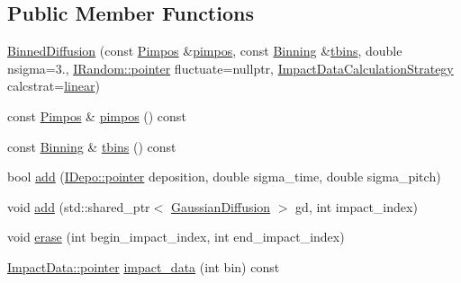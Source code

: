 \subsection*{Public Member Functions}
\begin{DoxyCompactItemize}
\item 
\hyperlink{class_wire_cell_1_1_gen_1_1_binned_diffusion_a56e229d36047227ce458ac4165a5b5ce}{Binned\+Diffusion} (const \hyperlink{class_wire_cell_1_1_pimpos}{Pimpos} \&\hyperlink{class_wire_cell_1_1_gen_1_1_binned_diffusion_acdc13c03fa55ddc92c6cd134d07b6bf3}{pimpos}, const \hyperlink{class_wire_cell_1_1_binning}{Binning} \&\hyperlink{class_wire_cell_1_1_gen_1_1_binned_diffusion_add5e00394c16a9fc27be4b7d617fa59b}{tbins}, double nsigma=3., \hyperlink{class_wire_cell_1_1_interface_a09c548fb8266cfa39afb2e74a4615c37}{I\+Random\+::pointer} fluctuate=nullptr, \hyperlink{class_wire_cell_1_1_gen_1_1_binned_diffusion_a96d624fc75e70453e7e29c381850d218}{Impact\+Data\+Calculation\+Strategy} calcstrat=\hyperlink{class_wire_cell_1_1_gen_1_1_binned_diffusion_a96d624fc75e70453e7e29c381850d218a6079f954d643f93c2c08d58967c21e0e}{linear})
\item 
const \hyperlink{class_wire_cell_1_1_pimpos}{Pimpos} \& \hyperlink{class_wire_cell_1_1_gen_1_1_binned_diffusion_acdc13c03fa55ddc92c6cd134d07b6bf3}{pimpos} () const
\item 
const \hyperlink{class_wire_cell_1_1_binning}{Binning} \& \hyperlink{class_wire_cell_1_1_gen_1_1_binned_diffusion_add5e00394c16a9fc27be4b7d617fa59b}{tbins} () const
\item 
bool \hyperlink{class_wire_cell_1_1_gen_1_1_binned_diffusion_a9c4c6664c76ad07ad29d71bdb8fb92f1}{add} (\hyperlink{class_wire_cell_1_1_i_data_aff870b3ae8333cf9265941eef62498bc}{I\+Depo\+::pointer} deposition, double sigma\+\_\+time, double sigma\+\_\+pitch)
\item 
void \hyperlink{class_wire_cell_1_1_gen_1_1_binned_diffusion_a61e86aee3ea24b3a56b58f8c310300d4}{add} (std\+::shared\+\_\+ptr$<$ \hyperlink{class_wire_cell_1_1_gen_1_1_gaussian_diffusion}{Gaussian\+Diffusion} $>$ gd, int impact\+\_\+index)
\item 
void \hyperlink{class_wire_cell_1_1_gen_1_1_binned_diffusion_a1b261eff7e9581f22bd83d1ea40077ed}{erase} (int begin\+\_\+impact\+\_\+index, int end\+\_\+impact\+\_\+index)
\item 
\hyperlink{class_wire_cell_1_1_gen_1_1_impact_data_a4fb9b565e1525c7ccde05ded67f467c2}{Impact\+Data\+::pointer} \hyperlink{class_wire_cell_1_1_gen_1_1_binned_diffusion_a22377d1afccdee836981ce2979ab49b4}{impact\+\_\+data} (int bin) const

\end{DoxyCompactItemize}
